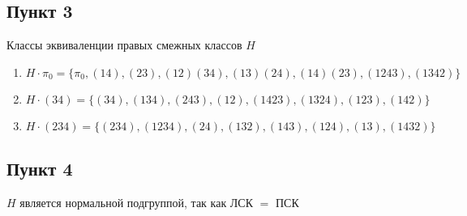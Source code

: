 \documentclass{article}
\begin{document}
\subsection*{Пункт 3}
Классы эквиваленции правых смежных классов $H$
\begin{enumerate}
    \item $H \cdot \pi_0  = \{\pi_0, (14), (23), (12)(34), (13)(24), (14)(23), (1243), (1342)\}$
    \item $H \cdot (34) = \{(34), (134), (243), (12), (1423), (1324), (123), (142)\}$
    \item $H \cdot (234) = \{(234), (1234), (24), (132), (143), (124), (13), (1432)\}$
\end{enumerate}

\subsection*{Пункт 4}
$H$ является нормальной подгруппой, так как ЛСК $=$ ПСК
\end{document}
